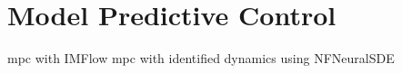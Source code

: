\section{Model Predictive Control}
\label{sec:methods:mpc}

mpc with IMFlow
mpc with identified dynamics using NFNeuralSDE

